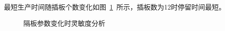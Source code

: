 \documentclass{whutmod}
\begin{document}
最短生产时间随插板个数变化如图~\ref{xdffadaasdx}~所示，插板数为12时停留时间最短。
\begin{figure}[H]
\centering
{}
\caption{隔板参数变化时灵敏度分析}\label{xdffadaasdx}
\end{figure}
\end{document}
